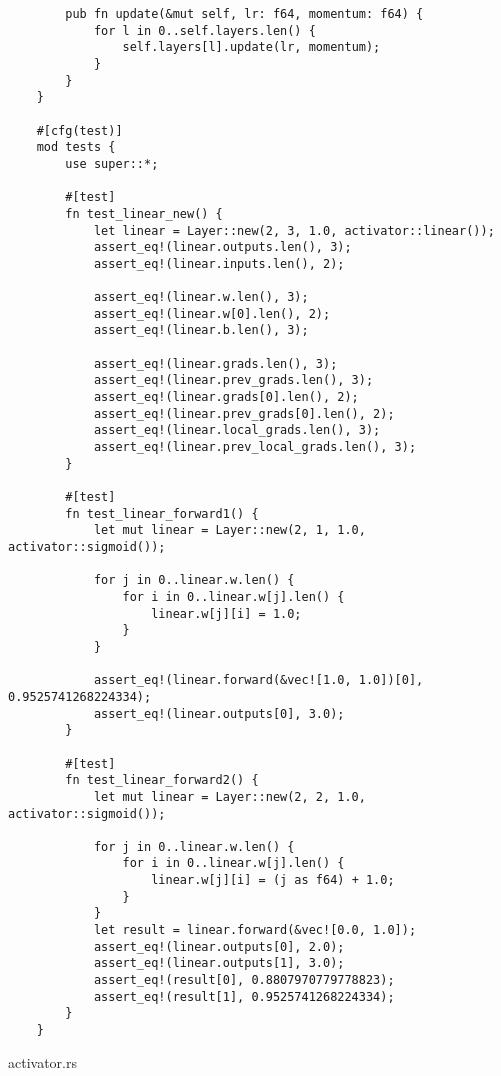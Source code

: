 \begin{verbatim}
        pub fn update(&mut self, lr: f64, momentum: f64) {
            for l in 0..self.layers.len() {
                self.layers[l].update(lr, momentum);
            }
        }
    }
    
    #[cfg(test)]
    mod tests {
        use super::*;
    
        #[test]
        fn test_linear_new() {
            let linear = Layer::new(2, 3, 1.0, activator::linear());
            assert_eq!(linear.outputs.len(), 3);
            assert_eq!(linear.inputs.len(), 2);
    
            assert_eq!(linear.w.len(), 3);
            assert_eq!(linear.w[0].len(), 2);
            assert_eq!(linear.b.len(), 3);
    
            assert_eq!(linear.grads.len(), 3);
            assert_eq!(linear.prev_grads.len(), 3);
            assert_eq!(linear.grads[0].len(), 2);
            assert_eq!(linear.prev_grads[0].len(), 2);
            assert_eq!(linear.local_grads.len(), 3);
            assert_eq!(linear.prev_local_grads.len(), 3);
        }
    
        #[test]
        fn test_linear_forward1() {
            let mut linear = Layer::new(2, 1, 1.0, activator::sigmoid());
    
            for j in 0..linear.w.len() {
                for i in 0..linear.w[j].len() {
                    linear.w[j][i] = 1.0;
                }
            }
    
            assert_eq!(linear.forward(&vec![1.0, 1.0])[0], 0.9525741268224334);
            assert_eq!(linear.outputs[0], 3.0);
        }
    
        #[test]
        fn test_linear_forward2() {
            let mut linear = Layer::new(2, 2, 1.0, activator::sigmoid());
    
            for j in 0..linear.w.len() {
                for i in 0..linear.w[j].len() {
                    linear.w[j][i] = (j as f64) + 1.0;
                }
            }
            let result = linear.forward(&vec![0.0, 1.0]);
            assert_eq!(linear.outputs[0], 2.0);
            assert_eq!(linear.outputs[1], 3.0);
            assert_eq!(result[0], 0.8807970779778823);
            assert_eq!(result[1], 0.9525741268224334);
        }
    }   
\end{verbatim}
\noindent activator.rs
